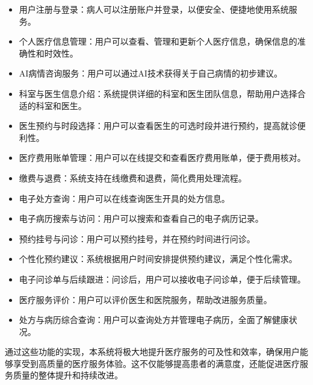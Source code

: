 \begin{itemize}
	\item 用户注册与登录：病人可以注册账户并登录，以便安全、便捷地使用系统服务。
	\item 个人医疗信息管理：用户可以查看、管理和更新个人医疗信息，确保信息的准确性和时效性。
	\item AI病情咨询服务：用户可以通过AI技术获得关于自己病情的初步建议。
	\item 科室与医生信息介绍：系统提供详细的科室和医生团队信息，帮助用户选择合适的科室和医生。
	\item 医生预约与时段选择：用户可以查看医生的可选时段并进行预约，提高就诊便利性。
	\item 医疗费用账单管理：用户可以在线提交和查看医疗费用账单，便于费用核对。
	\item 缴费与退费：系统支持在线缴费和退费，简化费用处理流程。
	\item 电子处方查询：用户可以在线查询医生开具的处方信息。
	\item 电子病历搜索与访问：用户可以搜索和查看自己的电子病历记录。
	\item 预约挂号与问诊：用户可以预约挂号，并在预约时间进行问诊。
	\item 个性化预约建议：系统根据用户时间安排提供预约建议，满足个性化需求。
	\item 电子问诊单与后续跟进：问诊后，用户可以接收电子问诊单，便于后续管理。
	\item 医疗服务评价：用户可以评价医生和医院服务，帮助改进服务质量。
	\item 处方与病历综合查询：用户可以查询处方并管理电子病历，全面了解健康状况。
\end{itemize}

通过这些功能的实现，本系统将极大地提升医疗服务的可及性和效率，确保用户能够享受到高质量的医疗服务体验。这不仅能够提高患者的满意度，还能促进医疗服务质量的整体提升和持续改进。